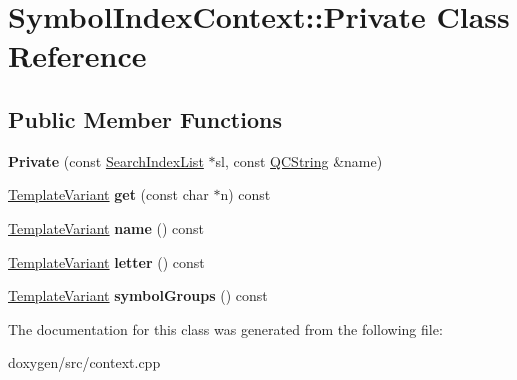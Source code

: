 \hypertarget{class_symbol_index_context_1_1_private}{}\section{Symbol\+Index\+Context\+::Private Class Reference}
\label{class_symbol_index_context_1_1_private}
\subsection*{Public Member Functions}
\begin{DoxyCompactItemize}
\item 
\mbox{\label{class_symbol_index_context_1_1_private_a4cc9c4b2e73864e6f4b88db06424f2e3}} 
{\bfseries Private} (const \mbox{\hyperlink{class_search_index_list}{Search\+Index\+List}} $\ast$sl, const \mbox{\hyperlink{class_q_c_string}{Q\+C\+String}} \&name)
\item 
\mbox{\label{class_symbol_index_context_1_1_private_a09dd30ac6d61dc56604cc1408b199f8b}} 
\mbox{\hyperlink{class_template_variant}{Template\+Variant}} {\bfseries get} (const char $\ast$n) const
\item 
\mbox{\label{class_symbol_index_context_1_1_private_a9da8b81bba12a5ccc0d0408d185c04f9}} 
\mbox{\hyperlink{class_template_variant}{Template\+Variant}} {\bfseries name} () const
\item 
\mbox{\label{class_symbol_index_context_1_1_private_a273a4ec85e1272f5fbe359679ca80d5f}} 
\mbox{\hyperlink{class_template_variant}{Template\+Variant}} {\bfseries letter} () const
\item 
\mbox{\label{class_symbol_index_context_1_1_private_a551383ef3e516a5e6a9620304f083f51}} 
\mbox{\hyperlink{class_template_variant}{Template\+Variant}} {\bfseries symbol\+Groups} () const
\end{DoxyCompactItemize}


The documentation for this class was generated from the following file\+:\begin{DoxyCompactItemize}
\item 
doxygen/src/context.\+cpp\end{DoxyCompactItemize}
